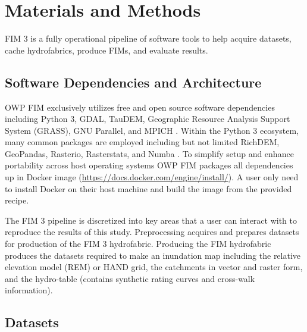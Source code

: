 \section{Materials and Methods}

FIM 3 is a fully operational pipeline of software tools to help acquire datasets, cache hydrofabrics, produce FIMs, and evaluate results.

\subsection{Software Dependencies and Architecture}

OWP FIM exclusively utilizes free and open source software dependencies including Python 3, GDAL, TauDEM, Geographic Resource Analysis Support System (GRASS), GNU Parallel, and MPICH \cite{python382,gdal2020,tarboton2005terrain,grass2020,tange2015gnu,amer2021mpich}.
Within the Python 3 ecosystem, many common packages are employed including but not limited RichDEM, GeoPandas, Rasterio, Rasterstats, and Numba \cite{barnes2018richdem,jordahl2014geopandas,lam2015numba}. 
To simplify setup and enhance portability across host operating systems OWP FIM packages all dependencies up in Docker image (\url{https://docs.docker.com/engine/install/}). 
A user only need to install Docker on their host machine and build the image from the provided recipe. 


The FIM 3 pipeline is discretized into key areas that a user can interact with to reproduce the results of this study. Preprocessing acquires and prepares datasets for production of the FIM 3 hydrofabric. 
Producing the FIM hydrofabric produces the datasets required to make an inundation map including the relative elevation model (REM) or HAND grid, the catchments in vector and raster form, and the hydro-table (contains synthetic rating curves and cross-walk information).

\subsection{Datasets}

